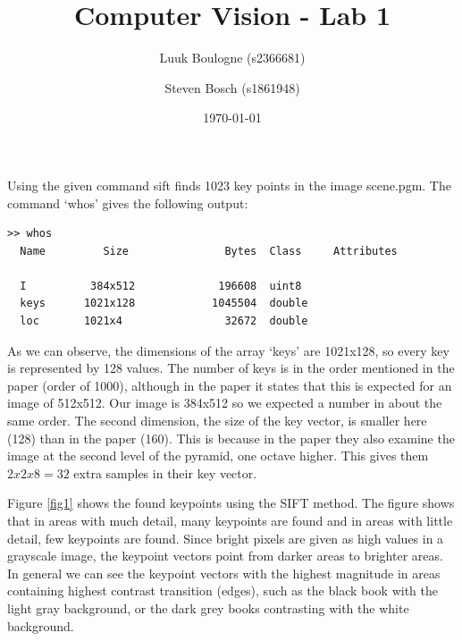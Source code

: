 \documentclass{article}
\title{Computer Vision - Lab 1}
\author{Luuk Boulogne (s2366681) \and Steven Bosch (s1861948)}
\date{\today}
\begin{document}
\maketitle

\section{}
\subsection{}
Using the given command sift finds 1023 key points in the image scene.pgm. The command `whos' gives the following output:
\begin{lstlisting}
>> whos
  Name         Size               Bytes  Class     Attributes

  I          384x512             196608  uint8               
  keys      1021x128            1045504  double              
  loc       1021x4                32672  double    
\end{lstlisting}
As we can observe, the dimensions of the array `keys' are 1021x128, so every key is represented by 128 values. 
The number of keys is in the order mentioned in the paper (order of 1000), although in the paper it states that this is expected for an image of 512x512. Our image is 384x512 so we expected a number in about the same order. The second dimension, the size of the key vector, is smaller here (128) than in the paper (160). This is because in the paper they also examine the image at the second level of the pyramid, one octave higher. This gives them $2x2x8 = 32$ extra samples in their key vector.

Figure \ref{fig1} shows the found keypoints using the SIFT method. The figure shows that in areas with much detail, many keypoints are found and in areas with little detail, few keypoints are found. Since bright pixels are given as high values in a grayscale image, the keypoint vectors point from darker areas to brighter areas. In general we can see the keypoint vectors with the highest magnitude in areas containing highest contrast transition (edges), such as the black book with the light gray background, or the dark grey books contrasting with the white background. 
\end{document}
